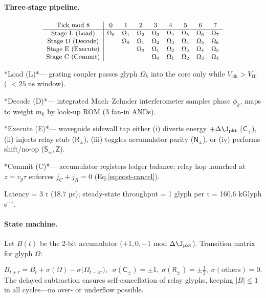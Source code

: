 \documentclass[11pt,oneside]{book}
\begin{document}
\paragraph{Three-stage pipeline.}

\[
\small
\begin{array}{c|cccccccc}
\text{Tick mod 8} & 0 & 1 & 2 & 3 & 4 & 5 & 6 & 7\\\hline
\text{Stage L (Load)}    & \Omega_0 & \Omega_1 & \Omega_2 & \Omega_3 & \Omega_4 & \Omega_5 & \Omega_6 & \Omega_7\\
\text{Stage D (Decode)}  &           & \Omega_0 & \Omega_1 & \Omega_2 & \Omega_3 & \Omega_4 & \Omega_5 & \Omega_6\\
\text{Stage E (Execute)} &           &           & \Omega_0 & \Omega_1 & \Omega_2 & \Omega_3 & \Omega_4 & \Omega_5\\
\text{Stage C (Commit)}  &           &           &           & \Omega_0 & \Omega_1 & \Omega_2 & \Omega_3 & \Omega_4\\
\end{array}
\]

*Load (L)*— grating coupler passes glyph \(\Omega_{k}\) into the core  
only while \(V_{\!\mathrm{clk}}\!>\!V_{\mathrm{th}}\) ( \(<\!25\;\mathrm{ns}\) window).

*Decode (D)*— integrated Mach–Zehnder interferometer samples phase \(\phi_{k}\),
maps to weight \(m_{k}\) by look-up ROM (3 fan-in ANDs).

*Execute (E)*— waveguide sidewall tap either  
(i) diverts energy \(+\Delta\J_{\mathrm{pkt}}\) (\(\mathsf{C}_{+}\)),  
(ii) injects relay stub (\(\mathsf{R}_{\pm}\)),  
(iii) toggles accumulator parity (\(\mathsf{N}_{\pm}\)), or  
(iv) performs shift/no-op (\(\mathsf{S}_{\pm},\mathsf{Z}\)).

*Commit (C)*— accumulator registers ledger balance;
relay hop launched at \(z = v_{g}\tau\) enforces
\(j_{C}+j_{R}=0\) (Eq.​\ref{eq:cost-cancel}).

Latency = 3 τ (18.7 µs);  
steady-state throughput = 1 glyph per τ = 160.6 kGlyph s\(^{-1}\).

\paragraph{State machine.}
Let \(B(t)\) be the 2-bit accumulator
(\(+1,0,-1\) mod \(\Delta\J_{\mathrm{pkt}}\)).
Transition matrix for glyph \(\Omega\):

\[
   B_{t+\tau} =
   B_t + \sigma(\Omega) - \sigma\!\bigl(\Omega_{t-3\tau}\bigr),
   \;\;
   \sigma(\mathsf{C_{\pm}})=\pm1,\;
   \sigma(\mathsf{R_{\pm}})=\pm\tfrac12,\;
   \sigma(\text{others})=0 .
\]
The delayed subtraction ensures self-cancellation of relay glyphs,
keeping \(|B|\!\le\!1\) in all cycles—no over- or underflow possible.
\end{document}
